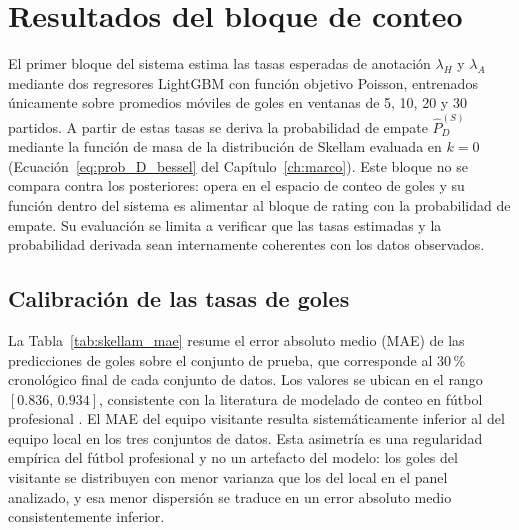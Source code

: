 
\section{Resultados del bloque de conteo}
\label{sec:res_conteo}

El primer bloque del sistema estima las tasas esperadas de anotaci\'on $\lambda_H$ y $\lambda_A$ mediante dos regresores LightGBM con funci\'on objetivo Poisson, entrenados \'unicamente sobre promedios m\'oviles de goles en ventanas de 5, 10, 20 y 30 partidos. A partir de estas tasas se deriva la probabilidad de empate $\hat{P}_D^{(S)}$ mediante la funci\'on de masa de la distribuci\'on de Skellam evaluada en $k=0$ (Ecuaci\'on~\eqref{eq:prob_D_bessel} del Cap\'itulo~\ref{ch:marco}). Este bloque no se compara contra los posteriores: opera en el espacio de conteo de goles y su funci\'on dentro del sistema es alimentar al bloque de rating con la probabilidad de empate. Su evaluaci\'on se limita a verificar que las tasas estimadas y la probabilidad derivada sean internamente coherentes con los datos observados.

\subsection{Calibraci\'on de las tasas de goles}
\label{subsec:res_calibracion_goals}

La Tabla~\ref{tab:skellam_mae} resume el error absoluto medio (MAE) de las predicciones de goles sobre el conjunto de prueba, que corresponde al 30\,\% cronol\'ogico final de cada conjunto de datos. Los valores se ubican en el rango $[0{.}836,\,0{.}934]$, consistente con la literatura de modelado de conteo en f\'utbol profesional \cite{maher1982,karlis2003}. El MAE del equipo visitante resulta sistem\'aticamente inferior al del equipo local en los tres conjuntos de datos. Esta asimetr\'ia es una regularidad emp\'irica del f\'utbol profesional y no un artefacto del modelo: los goles del visitante se distribuyen con menor varianza que los del local en el panel analizado, y esa menor dispersi\'on se traduce en un error absoluto medio consistentemente inferior.



